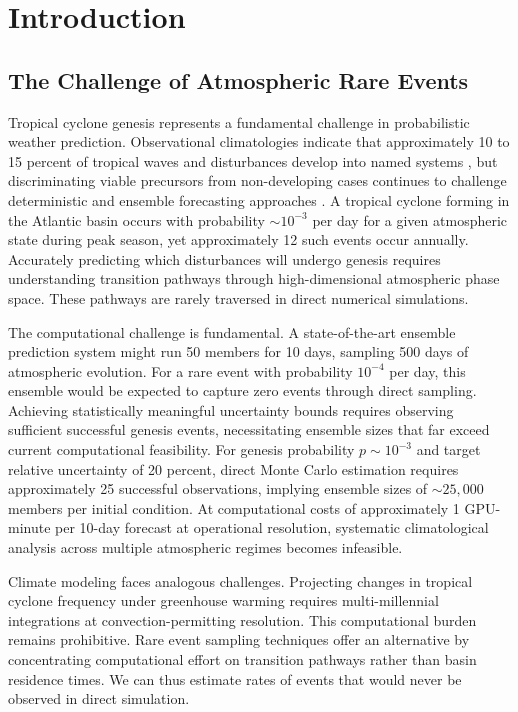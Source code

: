 \documentclass[11pt]{article}
\begin{document}
\section{Introduction}

\subsection{The Challenge of Atmospheric Rare Events}

Tropical cyclone genesis represents a fundamental challenge in probabilistic weather prediction. Observational climatologies indicate that approximately 10 to 15 percent of tropical waves and disturbances develop into named systems \citep{Frank1970,Landsea1998}, but discriminating viable precursors from non-developing cases continues to challenge deterministic and ensemble forecasting approaches \citep{Titley2019,Halperin2013}. A tropical cyclone forming in the Atlantic basin occurs with probability $\sim 10^{-3}$ per day for a given atmospheric state during peak season, yet approximately 12 such events occur annually. Accurately predicting which disturbances will undergo genesis requires understanding transition pathways through high-dimensional atmospheric phase space. These pathways are rarely traversed in direct numerical simulations.

The computational challenge is fundamental. A state-of-the-art ensemble prediction system might run 50 members for 10 days, sampling 500 days of atmospheric evolution. For a rare event with probability $10^{-4}$ per day, this ensemble would be expected to capture zero events through direct sampling. Achieving statistically meaningful uncertainty bounds requires observing sufficient successful genesis events, necessitating ensemble sizes that far exceed current computational feasibility. For genesis probability $p \sim 10^{-3}$ and target relative uncertainty of 20 percent, direct Monte Carlo estimation requires approximately 25 successful observations, implying ensemble sizes of $\sim 25,000$ members per initial condition. At computational costs of approximately 1 GPU-minute per 10-day forecast at operational resolution, systematic climatological analysis across multiple atmospheric regimes becomes infeasible.

Climate modeling faces analogous challenges. Projecting changes in tropical cyclone frequency under greenhouse warming requires multi-millennial integrations at convection-permitting resolution. This computational burden remains prohibitive. Rare event sampling techniques offer an alternative by concentrating computational effort on transition pathways rather than basin residence times. We can thus estimate rates of events that would never be observed in direct simulation.
\end{document}
